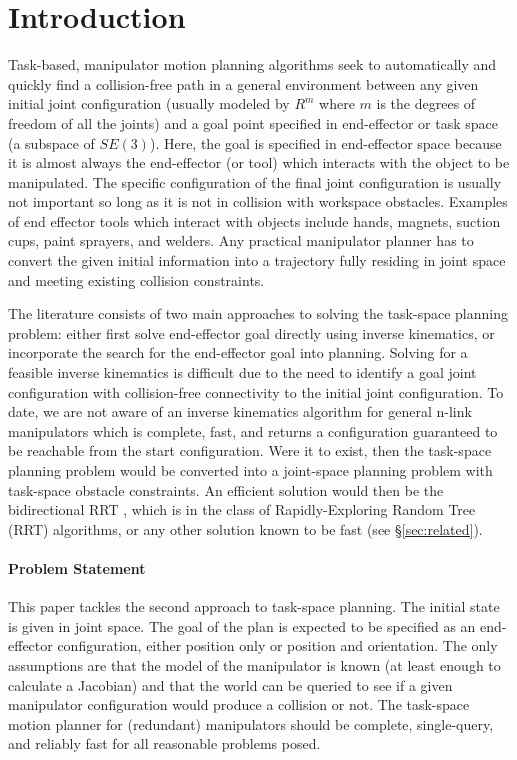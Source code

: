 \documentclass[conference]{IEEEtran}
\begin{document}

\section{Introduction}
Task-based, manipulator motion planning algorithms seek to automatically and
quickly find a collision-free path in a general environment between any
given initial joint configuration (usually modeled by $R^m$ where $m$ is the
degrees of freedom of all the joints) and a goal point specified in 
end-effector or task space (a subspace of $SE(3)$).  Here, the goal is
specified in end-effector space because it is almost always the end-effector
(or tool) which interacts with the object to be manipulated. The specific
configuration of the final joint configuration is usually not important so
long as it is not in collision with workspace obstacles.  Examples of end
effector tools which interact with objects include hands, magnets, suction
cups, paint sprayers, and welders. Any practical manipulator planner has to
convert the given initial information into a trajectory fully residing in
joint space and meeting existing collision constraints.

The literature consists of two main approaches to solving the task-space
planning problem: either first solve end-effector goal directly using
inverse kinematics, or incorporate the search for the end-effector 
goal into planning.   Solving for a feasible inverse kinematics is difficult
due to the need to identify a goal joint configuration with collision-free
connectivity to the initial joint configuration.  To date, we are not
aware of an inverse kinematics algorithm for general n-link manipulators
which is complete, fast, and returns a configuration guaranteed to be
reachable from the start configuration.  Were it to exist, then the
task-space planning problem would be converted into a joint-space planning
problem with task-space obstacle constraints.  An efficient solution would
then be the bidirectional RRT \cite{lavalle00}, which is in the class of
Rapidly-Exploring Random Tree (RRT) algorithms, or any other solution
known to be fast (see \S \ref{sec:related}).

\paragraph{Problem Statement}
This paper tackles the second approach to task-space planning.  The initial
state is given in joint space.  The goal of the plan is expected to be 
specified as an end-effector configuration, either position only or position 
and orientation. The only assumptions are that the model of the manipulator
is known (at least enough to calculate a Jacobian) and that the world can be
queried to see if a given manipulator configuration would produce a
collision or not.  The task-space motion planner for (redundant) manipulators 
should be complete, single-query, and reliably fast for all reasonable
problems posed. 
\end{document}
